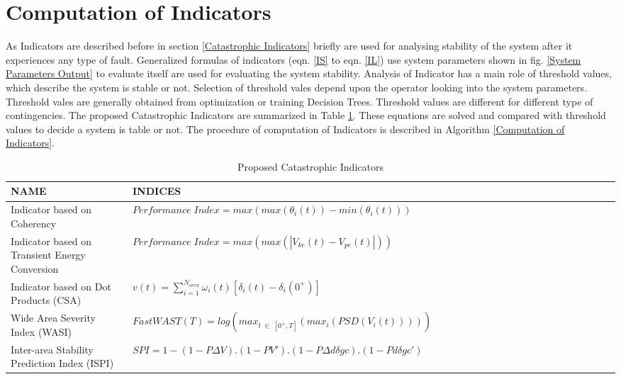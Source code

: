 \section{Computation of Indicators}
As Indicators are described before in section \ref{Catastrophic Indicators} briefly are used for analysing stability of the system after it experiences any type of fault. Generalized formulas of indicators (eqn. \ref{IS} to eqn. \ref{IL}) use system parameters shown in fig. \ref{System Parameters Output} to evaluate itself are used for evaluating the system stability. Analysis of Indicator has a main role of threshold values, which describe the system is stable or not. Selection of threshold vales depend upon the operator looking into the system parameters. Threshold vales are generally obtained from optimization or training Decision Trees. Threshold values are different for different type of contingencies. The proposed Catastrophic Indicators are summarized in Table \ref{Indicators}. These equations are solved and compared with threshold values to decide a system is table or not. The procedure of computation of Indicators is described in Algorithm \ref{Computation of Indicators}.

\begin{table}[!tb]

\renewcommand{\arraystretch}{2}
\caption{Proposed Catastrophic Indicators}
\label{Indicators}
\begin{tabular}{|P{0.2\linewidth} | P{0.8\linewidth}|}
\hline
 \textbf{NAME} & \textbf{INDICES}  \\ \hline
 Indicator based on Coherency & $Performance \; Index = max(max(\theta_i(t))-min(\theta_i(t)))$  \\ \hline
 Indicator based on Transient Energy Conversion & $Performance \; Index = max(max(|V_{ke}(t) - V_{pe}(t)|))$ \\  \hline 
 Indicator based on Dot Products (CSA) & $v(t) = \sum_{i=1}^{N_{area}} \omega_i(t)[\delta_i(t) - \delta_i(0^+)]$   \\ \hline
 Wide Area Severity Index (WASI) & $Fast WAST(T) = log(max_{t \; \in \; [0^+,T]}(max_i(PSD(V_i(t)))))$ \\  \hline 
 Inter-area Stability Prediction Index (ISPI) & $SPI = 1-(1-P\Delta V).(1-PV').(1-P\Delta d \delta gc).(1-Pd \delta gc') $ \\ \hline
\end{tabular}
\end{table}

